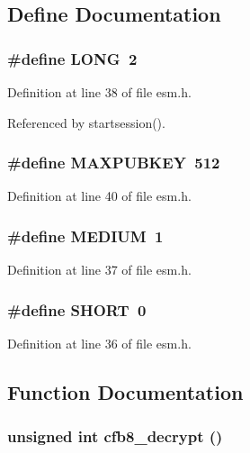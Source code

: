 \subsection{Define Documentation}
\subsubsection{\setlength{\rightskip}{0pt plus 5cm}\#define LONG\ 2}\label{esm_8h_a2}




Definition at line 38 of file esm.h.

Referenced by startsession().
\subsubsection{\setlength{\rightskip}{0pt plus 5cm}\#define MAXPUBKEY\ 512}\label{esm_8h_a3}




Definition at line 40 of file esm.h.
\subsubsection{\setlength{\rightskip}{0pt plus 5cm}\#define MEDIUM\ 1}\label{esm_8h_a1}




Definition at line 37 of file esm.h.
\subsubsection{\setlength{\rightskip}{0pt plus 5cm}\#define SHORT\ 0}\label{esm_8h_a0}




Definition at line 36 of file esm.h.

\subsection{Function Documentation}
\subsubsection{\setlength{\rightskip}{0pt plus 5cm}unsigned int cfb8\_\-decrypt ()}\label{esm_8h_a16}


